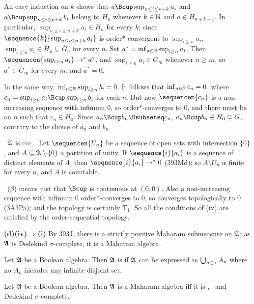 {An easy induction on $k$ shows that $a\Bcup\sup_{n\le i\le n+k}a_i$ and
$a\Bcup\sup_{n\le i\le n+k}b_i$ belong to $H_n$
whenever $k\in\Bbb N$ and $a\in H_{n+k+1}$.   In particular,
$\sup_{n\le i\le n+k}a_i\in H_n$ for every $k$;
since $\sequence{k}{\sup_{n\le i\le n+k}a_i}$ is
order*-convergent to $\sup_{i\ge n}a_i$,
$\sup_{i\ge n}a_i\in\overline{H}_n\subseteq\overline{G}_n$ for every
$n$.   Set $a^*=\inf_{n\in\Bbb N}\sup_{i\ge n}a_i$.
Then $\sequencen{\sup_{i\ge n}a_i}\to^* a^*$, and
$\sup_{i\ge n}a_i\in\overline{G}_m$ whenever $n\ge m$, so
$a^*\in\overline{G}_m$ for every $m$, and $a^*=0$.

In the same way, $\inf_{n\in\Bbb N}\sup_{i\ge n}b_i=0$.   It follows
that $\inf_{n\in\Bbb N}c_n=0$, where
$c_n=\sup_{i\ge n}a_i\Bcup\sup_{i\ge n}b_i$ for each $n$.   But now
$\sequencen{c_n}$ is a non-increasing sequence
with infimum $0$, so order*-converges to $0$, and there must be an $n$
such that $c_n\in H_0$.   Since
$a_n\Bcup b_n\Bsubseteq c_n$, $a_n\Bcup b_n\in H_0\subseteq G$, contrary
to the choice of $a_n$ and $b_n$.\ \Bang\Qed

\medskip

\quad\grheadc\ $\frak A$ is ccc.   \Prf\ Let $\sequencen{U_n}$ be a
sequence of open sets with intersection $\{0\}$, and
$A\subseteq\frak A\setminus\{0\}$ a partition of unity.
If $\sequence{i}{a_i}$ is a sequence
of distinct elements of $A$, then $\sequence{i}{a_i}\to^*0$ (393Md);  so
$A\setminus U_n$ is finite for every $n$, and $A$ is countable.\ \Qed

\medskip

\quad\grheadd\ ($\beta$) means just that $\Bcup$ is continuous at
$(0,0)$.   Also a non-increasing sequence
with infimum $0$ order*-converges to $0$, so converges topologically to
$0$ (3A3Pa);  and the topology is certainly T$_1$.   So all the
conditions of (iv) are satisfied by the order-sequential topology.

\medskip

{\bf (d)(iv)$\Rightarrow$(i)} By 393J, there is a strictly positive
Maharam submeasure on $\frak A$;  as $\frak A$ is Dedekind
$\sigma$-complete, it is a Maharam algebra.
}%

Let $\frak A$ be a Boolean algebra.   Then
$\frak A$ is {\bf\sfcc} if $\frak A$ can be expressed as
$\bigcup_{n\in\Bbb N}A_n$ where no $A_n$ includes any infinite disjoint
set.

Let $\frak A$ be a
Boolean algebra.   Then $\frak A$ is a Maharam algebra iff it is
\sfcc, \wsid\ and Dedekind $\sigma$-complete.

